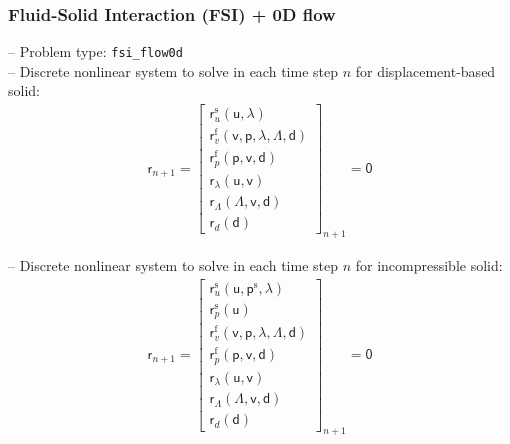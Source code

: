\documentclass[a4paper,12pt]{report}
\newcommand{\bs}[1]{\boldsymbol{#1}}
\newcommand{\ROP}{\bs{\mathsf{r}}}
\newcommand{\LM}{\bs{\mathsf{\lambda}}}
\newcommand{\LMZ}{\bs{\mathsf{\Lambda}}}
\begin{document}
\subsubsection{Fluid-Solid Interaction (FSI) + 0D flow}\label{fluid-solid-interaction-fsi-0d-flow}

-- Problem type: \verb"fsi_flow0d"\\

-- Discrete nonlinear system to solve in each time step $n$ for displacement-based solid:
\begin{equation}
\label{equation-nonlin-sys-fsi-0d}
\begin{aligned}
\ROP_{n+1} = \begin{bmatrix} \ROP_{u}^{\mathrm{s}}(\boldsymbol{\mathsf{u}},\LM) \\ \ROP_{v}^{\mathrm{f}}(\boldsymbol{\mathsf{v}},\boldsymbol{\mathsf{p}},\LM,\LMZ,\boldsymbol{\mathsf{d}}) \\ \ROP_{p}^{\mathrm{f}}(\boldsymbol{\mathsf{p}},\boldsymbol{\mathsf{v}},\boldsymbol{\mathsf{d}}) \\ \ROP_{\lambda}(\boldsymbol{\mathsf{u}},\boldsymbol{\mathsf{v}}) \\ \ROP_{\mathit{\Lambda}}(\LMZ,\boldsymbol{\mathsf{v}},\boldsymbol{\mathsf{d}}) \\ \ROP_{d}(\boldsymbol{\mathsf{d}}) \end{bmatrix}_{n+1} = \boldsymbol{\mathsf{0}}
\end{aligned}
\end{equation}

-- Discrete nonlinear system to solve in each time step $n$ for incompressible solid:
\begin{equation}
\label{equation-nonlin-sys-fsi-0d-inc}
\begin{aligned}
\ROP_{n+1} = \begin{bmatrix} \ROP_{u}^{\mathrm{s}}(\boldsymbol{\mathsf{u}},\boldsymbol{\mathsf{p}}^{\mathrm{s}},\LM) \\ \ROP_{p}^{\mathrm{s}}(\boldsymbol{\mathsf{u}}) \\ \ROP_{v}^{\mathrm{f}}(\boldsymbol{\mathsf{v}},\boldsymbol{\mathsf{p}},\LM,\LMZ,\boldsymbol{\mathsf{d}}) \\ \ROP_{p}^{\mathrm{f}}(\boldsymbol{\mathsf{p}},\boldsymbol{\mathsf{v}},\boldsymbol{\mathsf{d}}) \\ \ROP_{\lambda}(\boldsymbol{\mathsf{u}},\boldsymbol{\mathsf{v}}) \\ \ROP_{\mathit{\Lambda}}(\LMZ,\boldsymbol{\mathsf{v}},\boldsymbol{\mathsf{d}}) \\ \ROP_{d}(\boldsymbol{\mathsf{d}}) \end{bmatrix}_{n+1} = \boldsymbol{\mathsf{0}}
\end{aligned}
\end{equation}
\end{document}

